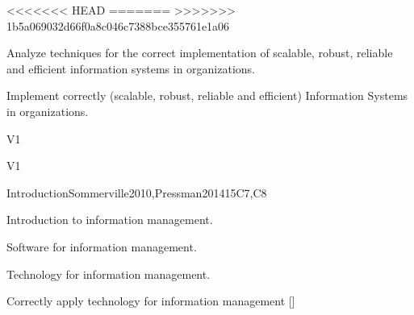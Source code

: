 \begin{syllabus}

<<<<<<< HEAD
=======
>>>>>>> 1b5a069032d66f0a8c046c7388bce355761e1a06

\begin{justification}
		Analyze techniques for the correct implementation of scalable, robust, reliable and efficient information systems in organizations.
	\end{justification}

	\begin{goals}
		\item Implement correctly (scalable, robust, reliable and efficient) Information Systems in organizations.
	\end{goals}

	\begin{outcomes}{V1}
		\item {}
		\item {}
		\item {}
	\end{outcomes}

	\begin{competences}{V1}
		\item {}
		\item {}
		\item {}
		\item {}
		\item {}
		\item {}
	\end{competences}

	\begin{unit}{Introduction}{}{Sommerville2010,Pressman2014}{15}{C7,C8}
		\begin{topics}
			\item Introduction to information management.
			\item Software for information management.
			\item Technology for information management.
		\end{topics}
		\begin{learningoutcomes}
			\item Correctly apply technology for information management [\Assessment]
		\end{learningoutcomes}
	\end{unit}


\end{syllabus}
